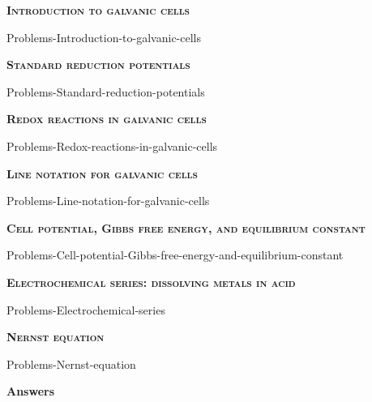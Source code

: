 \documentclass[main.tex]{subfiles}
\begin{document}
\newpage
 
\fancyhfoffset[E,O]{0pt}
\setlength{\columnsep}{30pt}
\begin{conclusion}
\end{conclusion}
\begin{multicols*}{2}\setcounter{numA}{1}
{\raggedright\textsc{\textbf{Introduction to galvanic cells}}\par} {Problems-Introduction-to-galvanic-cells}
{\raggedright\textsc{\textbf{Standard reduction potentials}}\par} {Problems-Standard-reduction-potentials}
{\raggedright\textsc{\textbf{Redox reactions in galvanic cells}}\par} {Problems-Redox-reactions-in-galvanic-cells}
{\raggedright\textsc{\textbf{Line notation for galvanic cells}}\par} {Problems-Line-notation-for-galvanic-cells}
{\raggedright\textsc{\textbf{Cell potential, Gibbs free energy, and equilibrium constant}}\par} {Problems-Cell-potential-Gibbs-free-energy-and-equilibrium-constant}
{\raggedright\textsc{\textbf{Electrochemical series: dissolving metals in acid}}\par} {Problems-Electrochemical-series}
{\raggedright\textsc{\textbf{Nernst equation}}\par} {Problems-Nernst-equation}



\end{multicols*}
\newpage
\begin{answersenvironment}
\begin{minipage}[c]{1\textwidth}
\begin{localsize}{10}
{\Large \bf Answers}
 \printsolutions 
\end{localsize}
\end{minipage}\end{answersenvironment}
\end{document}
